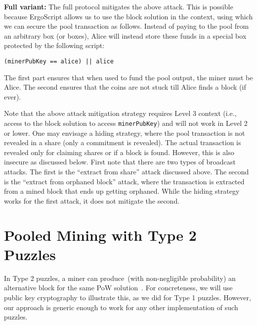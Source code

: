 \documentclass[11pt]{article}
\newcommand{\langname}{ErgoScript\xspace}
\begin{document}
\textbf{Full variant:} The full protocol mitigates the above attack. This is possible because \langname allows us to use the block solution in the context, using which we can secure the pool transaction as follows. Instead of paying to the pool from an arbitrary box (or boxes), Alice will instead store these funds in a special box protected by the following script:
\begin{verbatim}
(minerPubKey == alice) || alice
\end{verbatim}
The first part ensures that when used to fund the pool output, the miner must be Alice. The second ensures that the coins are not stuck till Alice finds a block (if ever). 

Note that the above attack mitigation strategy requires Level 3 context (i.e., access to the block solution to access \texttt{minerPubKey}) and will not work in Level 2 or lower. One may envisage a hiding strategy, where the pool transaction is not revealed in a share (only a commitment is revealed). The actual transaction is revealed only for claiming shares or if a block is found. However, this is also insecure as discussed below. First note that there are two types of broadcast attacks. The first is the ``extract from share'' attack discussed above. The second is the ``extract from orphaned block'' attack, where the transaction is extracted from a mined block that ends up getting orphaned. While the hiding strategy works for the first attack, it does not mitigate the second. 

\section{Pooled Mining with Type 2 Puzzles}
In Type 2 puzzles, a miner can produce~(with non-negligible probability) an alternative block for the same PoW solution~\cite{miller2015nonoutsourceable}.
For concreteness, we will use public key cryptography to illustrate this, as we did for Type 1 puzzles. However, our approach is generic enough to work for any other implementation of such puzzles.
\end{document}
